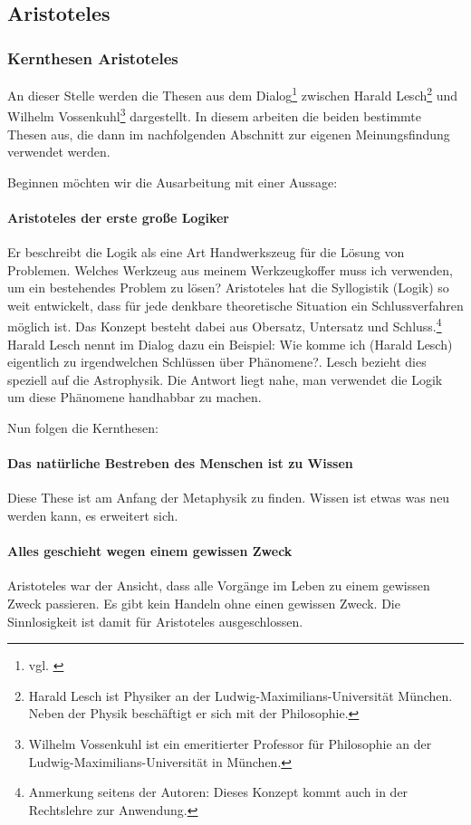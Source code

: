\subsection{Aristoteles}

\subsubsection{Kernthesen Aristoteles}

An dieser Stelle werden die Thesen aus dem Dialog\footnote{vgl. \cite{Aristoteles3}} zwischen Harald Lesch\footnote{Harald Lesch ist Physiker an der Ludwig-Maximilians-Universität München. Neben der Physik beschäftigt er sich mit der Philosophie.} und Wilhelm Vossenkuhl\footnote{Wilhelm Vossenkuhl ist ein emeritierter Professor für Philosophie an der Ludwig-Maximilians-Universität in München.} dargestellt. In diesem arbeiten die beiden bestimmte Thesen aus, die dann im nachfolgenden Abschnitt zur eigenen Meinungsfindung verwendet werden.

Beginnen möchten wir die Ausarbeitung mit einer Aussage:
\paragraph{\glqq Aristoteles der erste große Logiker\grqq}
Er beschreibt die Logik als eine Art Handwerkszeug für die Lösung von Problemen. Welches Werkzeug aus meinem Werkzeugkoffer muss ich verwenden, um ein bestehendes Problem zu lösen? Aristoteles hat die Syllogistik (Logik) so weit entwickelt, dass für jede denkbare theoretische Situation ein Schlussverfahren möglich ist. Das Konzept besteht dabei aus Obersatz, Untersatz und Schluss.\footnote{Anmerkung seitens der Autoren: Dieses Konzept kommt auch in der Rechtslehre zur Anwendung.} Harald Lesch nennt im Dialog dazu ein Beispiel: \glqq Wie komme ich (Harald Lesch) eigentlich zu irgendwelchen Schlüssen über Phänomene?\grqq. Lesch bezieht dies speziell auf die Astrophysik. Die Antwort liegt nahe, man verwendet die Logik um diese Phänomene handhabbar zu machen.

Nun folgen die Kernthesen:
\paragraph{Das natürliche Bestreben des Menschen ist zu Wissen}
Diese These ist am Anfang der Metaphysik zu finden. Wissen ist etwas was neu werden kann, es erweitert sich.  

\paragraph{Alles geschieht wegen einem gewissen Zweck} 
Aristoteles war der Ansicht, dass alle Vorgänge im Leben zu einem gewissen Zweck passieren. Es gibt kein Handeln ohne einen gewissen Zweck. Die Sinnlosigkeit ist damit für Aristoteles ausgeschlossen.

